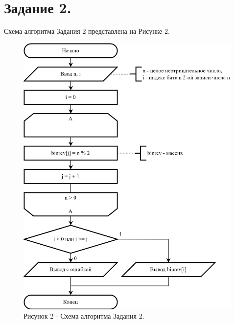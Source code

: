 \documentclass[oneside,a4paper,14pt]{extarticle} %
\begin{document}
\section*{Задание 2.}
\noindent Схема алгоритма Задания 2 представлена на Рисунке 2.\\
\begin{figure}[!ht]
	\centering
	\includegraphics[height=0.55\textheight]{pics/2-flowchart.png}
	\caption*{Рисунок 2 - Схема алгоритма Задания 2.}
\end{figure}
\newpage
\end{document}
